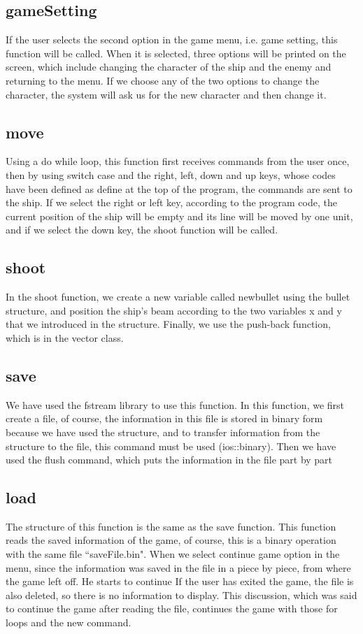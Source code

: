 \documentclass[12pt,a4paper]{article}
\begin{document}
	\subsection{gameSetting}
	If the user selects the second option in the game menu, i.e. game setting, this function will be called. When it is selected, 
	three options will be printed on the screen, which include changing the character of the ship and the enemy and returning to the menu. If we choose any of the two options to change the character, 
	the system will ask us for the new character and then change it.
	\subsection{move}
	Using a do while loop, this function first receives commands from the user once, then by using switch case and the right, left, down and up keys,
	whose codes have been defined as define at the top of the program, the commands are sent to the ship. If we select the right or left key,
	according to the program code, the current position of the ship will be empty and its line will be moved by one unit, and if we select the down key,
	the shoot function will be called.
	\subsection{shoot}
	In the shoot function, we create a new variable called newbullet using the bullet structure, 
	and position the ship's beam according to the two variables x and y that we introduced in the structure.
	 Finally, we use the push-back function, which is in the vector class.
	\subsection{save}
	We have used the fstream library to use this function.
    In this function, we first create a file, of course, the information in this file is stored in binary form because we have used the structure, and to transfer information from the structure to the file, this command must be used (ios::binary).
    Then we have used the flush command, which puts the information in the file part by part
	\subsection{load}
    The structure of this function is the same as the save function. This function reads the saved information of the game, of course, this is a binary operation with the same file ``saveFile.bin".
    When we select continue game option in the menu, since the information was saved in the file in a piece by piece, from where the game left off.
    He starts to continue
    If the user has exited the game, the file is also deleted, so there is no information to display.
    This discussion, which was said to continue the game after reading the file, continues the game with those for loops and the new command.
	\newpage
	\setcounter{section}{0}
\end{document}

